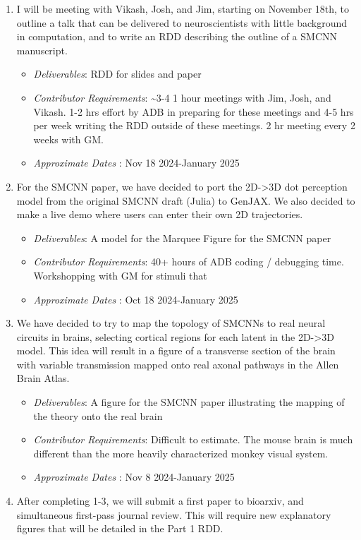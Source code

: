 \documentclass[
  letterpaper,
  DIV=11,
  numbers=noendperiod]{scrartcl}
\providecommand{\tightlist}{%
  \setlength{\itemsep}{0pt}\setlength{\parskip}{0pt}}\usepackage{longtable,booktabs,array}
\begin{document}
\begin{enumerate}
\def\labelenumi{\arabic{enumi}.}
\item
  I will be meeting with Vikash, Josh, and Jim, starting on November
  18th, to outline a talk that can be delivered to neuroscientists with
  little background in computation, and to write an RDD describing the
  outline of a SMCNN manuscript.

  \begin{itemize}
  \tightlist
  \item
    \emph{Deliverables}: RDD for slides and paper
  \item
    \emph{Contributor Requirements}: \textasciitilde3-4 1 hour meetings
    with Jim, Josh, and Vikash. 1-2 hrs effort by ADB in preparing for
    these meetings and 4-5 hrs per week writing the RDD outside of these
    meetings. 2 hr meeting every 2 weeks with GM.
  \item
    \emph{Approximate Dates} : Nov 18 2024-January 2025
  \end{itemize}
\item
  For the SMCNN paper, we have decided to port the 2D-\textgreater3D dot
  perception model from the original SMCNN draft (Julia) to GenJAX. We
  also decided to make a live demo where users can enter their own 2D
  trajectories.

  \begin{itemize}
  \tightlist
  \item
    \emph{Deliverables}: A model for the Marquee Figure for the SMCNN
    paper
  \item
    \emph{Contributor Requirements}: 40+ hours of ADB coding / debugging
    time. Workshopping with GM for stimuli that
  \item
    \emph{Approximate Dates} : Oct 18 2024-January 2025
  \end{itemize}
\item
  We have decided to try to map the topology of SMCNNs to real neural
  circuits in brains, selecting cortical regions for each latent in the
  2D-\textgreater3D model. This idea will result in a figure of a
  transverse section of the brain with variable transmission mapped onto
  real axonal pathways in the Allen Brain Atlas.

  \begin{itemize}
  \tightlist
  \item
    \emph{Deliverables}: A figure for the SMCNN paper illustrating the
    mapping of the theory onto the real brain
  \item
    \emph{Contributor Requirements}: Difficult to estimate. The mouse
    brain is much different than the more heavily characterized monkey
    visual system.
  \item
    \emph{Approximate Dates} : Nov 8 2024-January 2025
  \end{itemize}
\item
  After completing 1-3, we will submit a first paper to bioarxiv, and
  simultaneous first-pass journal review. This will require new
  explanatory figures that will be detailed in the Part 1 RDD.


\end{enumerate}
\end{document}
